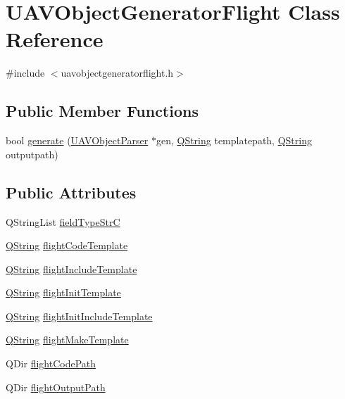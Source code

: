 \hypertarget{class_u_a_v_object_generator_flight}{\section{U\-A\-V\-Object\-Generator\-Flight Class Reference}
\label{class_u_a_v_object_generator_flight}
}


{\ttfamily \#include $<$uavobjectgeneratorflight.\-h$>$}

\subsection*{Public Member Functions}
\begin{DoxyCompactItemize}
\item 
bool \hyperlink{class_u_a_v_object_generator_flight_a72639ebd26a0325c0dfa7197b129b7af}{generate} (\hyperlink{class_u_a_v_object_parser}{U\-A\-V\-Object\-Parser} $\ast$gen, \hyperlink{group___u_a_v_objects_plugin_gab9d252f49c333c94a72f97ce3105a32d}{Q\-String} templatepath, \hyperlink{group___u_a_v_objects_plugin_gab9d252f49c333c94a72f97ce3105a32d}{Q\-String} outputpath)
\end{DoxyCompactItemize}
\subsection*{Public Attributes}
\begin{DoxyCompactItemize}
\item 
Q\-String\-List \hyperlink{class_u_a_v_object_generator_flight_aa82271cfd32a84266be0ede3b7466b9f}{field\-Type\-Str\-C}
\item 
\hyperlink{group___u_a_v_objects_plugin_gab9d252f49c333c94a72f97ce3105a32d}{Q\-String} \hyperlink{class_u_a_v_object_generator_flight_a22a87ad4e972a2b9dcd67a08ba7d68cb}{flight\-Code\-Template}
\item 
\hyperlink{group___u_a_v_objects_plugin_gab9d252f49c333c94a72f97ce3105a32d}{Q\-String} \hyperlink{class_u_a_v_object_generator_flight_a7503ec01fd020de32a3eb7039be6dd41}{flight\-Include\-Template}
\item 
\hyperlink{group___u_a_v_objects_plugin_gab9d252f49c333c94a72f97ce3105a32d}{Q\-String} \hyperlink{class_u_a_v_object_generator_flight_acff74a9be8ad7813ad294a48755e6bbc}{flight\-Init\-Template}
\item 
\hyperlink{group___u_a_v_objects_plugin_gab9d252f49c333c94a72f97ce3105a32d}{Q\-String} \hyperlink{class_u_a_v_object_generator_flight_a50b6f448b3e2e2da03d81d63e663d242}{flight\-Init\-Include\-Template}
\item 
\hyperlink{group___u_a_v_objects_plugin_gab9d252f49c333c94a72f97ce3105a32d}{Q\-String} \hyperlink{class_u_a_v_object_generator_flight_acdf4c6c02d4dfc2c5eb57916d01d4578}{flight\-Make\-Template}
\item 
Q\-Dir \hyperlink{class_u_a_v_object_generator_flight_a80c1a0b70c1e4e9715328aa30ecea842}{flight\-Code\-Path}
\item 
Q\-Dir \hyperlink{class_u_a_v_object_generator_flight_af61153c1d0b35847a5e9133952b215cc}{flight\-Output\-Path}
\end{DoxyCompactItemize}


